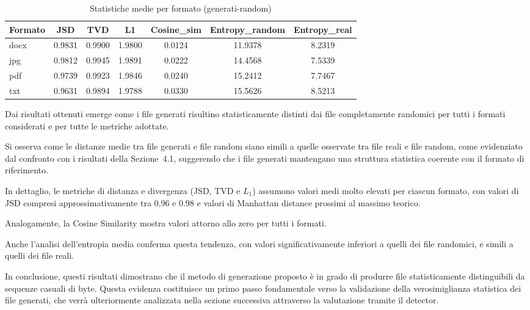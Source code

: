 \documentclass{report}
\begin{document}
\begin{table}[H]
\centering
\caption{Statistiche medie per formato (generati-random)}
\label{tab:mean-generated-random}
\renewcommand{\arraystretch}{1.25}
\setlength{\tabcolsep}{8pt}
\begin{tabular}{lcccccc}
\toprule
\textbf{Formato} & \textbf{JSD} & \textbf{TVD} & \textbf{L1} & \textbf{Cosine\_sim} & \textbf{Entropy\_random} & \textbf{Entropy\_real} \\
\midrule
docx & 0.9831 & 0.9900 & 1.9800 & 0.0124 & 11.9378 & 8.2319 \\
jpg  & 0.9812 & 0.9945 & 1.9891 & 0.0222 & 14.4568 & 7.5339 \\
pdf  & 0.9739 & 0.9923 & 1.9846 & 0.0240 & 15.2412 & 7.7467 \\
txt  & 0.9631 & 0.9894 & 1.9788 & 0.0330 & 15.5626 & 8.5213 \\
\bottomrule
\end{tabular}
\end{table}




\bigskip

Dai risultati ottenuti emerge come i file generati risultino statisticamente distinti
dai file completamente randomici per tutti i formati considerati e per tutte le metriche adottate.

\bigskip

Si osserva come le distanze medie tra file generati e file random 
siano simili a quelle osservate tra file reali e file random,
come evidenziato dal confronto con i risultati della Sezione~4.1, 
suggerendo che i file generati mantengano una struttura statistica coerente con il formato di riferimento.

\bigskip

In dettaglio, le metriche di distanza e divergenza (JSD, TVD e $L_1$) assumono
valori medi molto elevati per ciascun formato, con valori di JSD compresi
approssimativamente tra 0.96 e 0.98 e valori di Manhattan distance prossimi al massimo
teorico.

\bigskip

Analogamente, la Cosine Similarity mostra valori attorno allo zero per tutti i formati.

\bigskip

Anche l'analisi dell'entropia media conferma questa tendenza, con valori
significativamente inferiori a quelli dei file randomici, e simili a quelli dei file reali.

\bigskip

In conclusione, questi risultati dimostrano che il metodo di generazione proposto è in
grado di produrre file statisticamente distinguibili da sequenze casuali di byte.
Questa evidenza costituisce un primo passo fondamentale verso la
validazione della verosimiglianza statistica dei file generati, che verrà ulteriormente
analizzata nella sezione successiva attraverso la valutazione tramite il detector.
\end{document}

